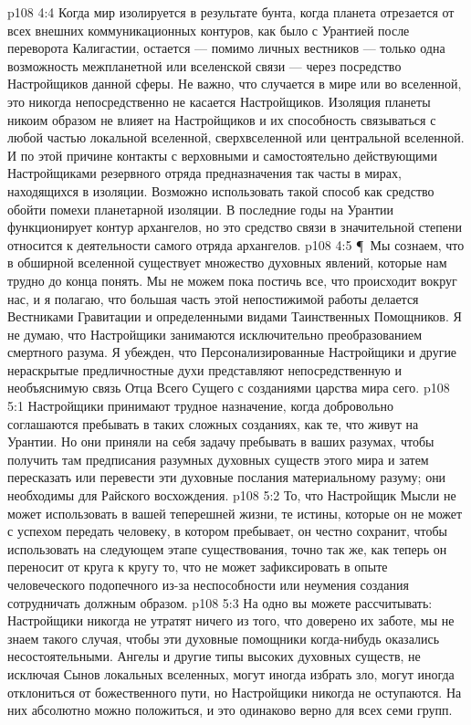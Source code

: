 \vs p108 4:4 Когда мир изолируется в результате бунта, когда планета отрезается от всех внешних коммуникационных контуров, как было с Урантией после переворота Калигастии, остается --- помимо личных вестников --- только одна возможность межпланетной или вселенской связи --- через посредство Настройщиков данной сферы. Не важно, что случается в мире или во вселенной, это никогда непосредственно не касается Настройщиков. Изоляция планеты никоим образом не влияет на Настройщиков и их способность связываться с любой частью локальной вселенной, сверхвселенной или центральной вселенной. И по этой причине контакты с верховными и самостоятельно действующими Настройщиками резервного отряда предназначения так часты в мирах, находящихся в изоляции. Возможно использовать такой способ как средство обойти помехи планетарной изоляции. В последние годы на Урантии функционирует контур архангелов, но это средство связи в значительной степени относится к деятельности самого отряда архангелов.
\vs p108 4:5 \P\ Мы сознаем, что в обширной вселенной существует множество духовных явлений, которые нам трудно до конца понять. Мы не можем пока постичь все, что происходит вокруг нас, и я полагаю, что большая часть этой непостижимой работы делается Вестниками Гравитации и определенными видами Таинственных Помощников. Я не думаю, что Настройщики занимаются исключительно преобразованием смертного разума. Я убежден, что Персонализированные Настройщики и другие нераскрытые предличностные духи представляют непосредственную и необъяснимую связь Отца Всего Сущего с созданиями царства мира сего.
\vs p108 5:1 Настройщики принимают трудное назначение, когда добровольно соглашаются пребывать в таких сложных созданиях, как те, что живут на Урантии. Но они приняли на себя задачу пребывать в ваших разумах, чтобы получить там предписания разумных духовных существ этого мира и затем пересказать или перевести эти духовные послания материальному разуму; они необходимы для Райского восхождения.
\vs p108 5:2 То, что Настройщик Мысли не может использовать в вашей теперешней жизни, те истины, которые он не может с успехом передать человеку, в котором пребывает, он честно сохранит, чтобы использовать на следующем этапе существования, точно так же, как теперь он переносит от круга к кругу то, что не может зафиксировать в опыте человеческого подопечного из\hyp{}за неспособности или неумения создания сотрудничать должным образом.
\vs p108 5:3 На одно вы можете рассчитывать: Настройщики никогда не утратят ничего из того, что доверено их заботе, мы не знаем такого случая, чтобы эти духовные помощники когда\hyp{}нибудь оказались несостоятельными. Ангелы и другие типы высоких духовных существ, не исключая Сынов локальных вселенных, могут иногда избрать зло, могут иногда отклониться от божественного пути, но Настройщики никогда не оступаются. На них абсолютно можно положиться, и это одинаково верно для всех семи групп.
